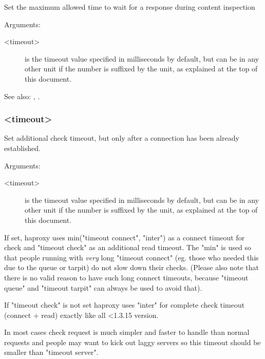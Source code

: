 
  Set the maximum allowed time to wait for a response during content inspection


  Arguments:
  \begin{description}
  \item[<timeout>] is the timeout value specified in milliseconds by default, but
              can be in any other unit if the number is suffixed by the unit,
              as explained at the top of this document.
  \end{description}


See also: , .

\subsubsection[timeout check]{ <timeout>}

  Set additional check timeout, but only after a connection has been already
  established.


  Arguments:
  \begin{description}
  \item[<timeout>] is the timeout value specified in milliseconds by default, but
              can be in any other unit if the number is suffixed by the unit,
              as explained at the top of this document.
  \end{description}

  If set, haproxy uses min("timeout connect", "inter") as a connect timeout
  for check and "timeout check" as an additional read timeout. The "min" is
  used so that people running with \emph{very} long "timeout connect" (eg. those
  who needed this due to the queue or tarpit) do not slow down their checks.
  (Please also note that there is no valid reason to have such long connect
  timeouts, because "timeout queue" and "timeout tarpit" can always be used to
  avoid that).

  If "timeout check" is not set haproxy uses "inter" for complete check
  timeout (connect + read) exactly like all <1.3.15 version.

  In most cases check request is much simpler and faster to handle than normal
  requests and people may want to kick out laggy servers so this timeout should
  be smaller than "timeout server".

